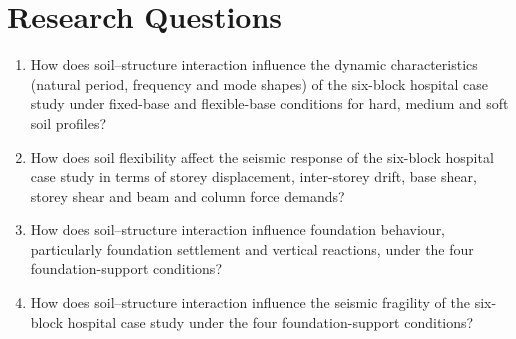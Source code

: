 \section{Research Questions}
\begin{enumerate}
\item How does soil--structure interaction influence the dynamic characteristics (natural period, frequency and mode shapes) of the six-block hospital case study under fixed-base and flexible-base conditions for hard, medium and soft soil profiles?
\item How does soil flexibility affect the seismic response of the six-block hospital case study in terms of storey displacement, inter-storey drift, base shear, storey shear and beam and column force demands?
\item How does soil--structure interaction influence foundation behaviour, particularly foundation settlement and vertical reactions, under the four foundation-support conditions?
\item How does soil--structure interaction influence the seismic fragility of the six-block hospital case study under the four foundation-support conditions?
\end{enumerate}
